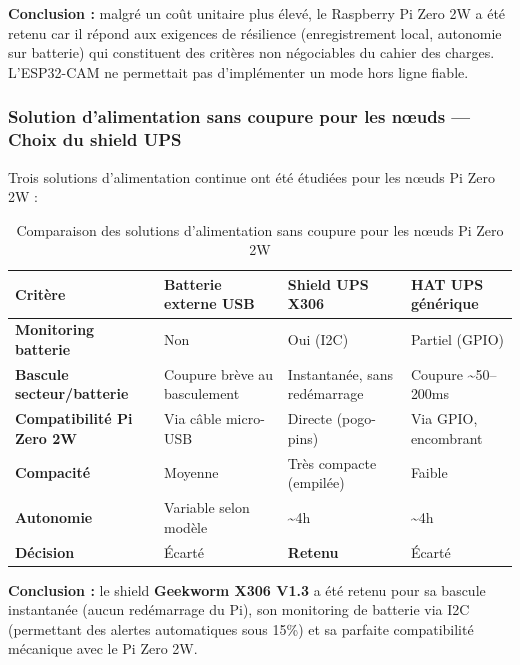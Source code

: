 \documentclass[12pt,a4paper]{article}
\begin{document}
\textbf{Conclusion :} malgré un coût unitaire plus élevé, le Raspberry Pi Zero 2W a été retenu car il répond aux exigences de résilience (enregistrement local, autonomie sur batterie) qui constituent des critères non négociables du cahier des charges. L'ESP32-CAM ne permettait pas d'implémenter un mode hors ligne fiable.

\subsubsection{Solution d'alimentation sans coupure pour les nœuds --- Choix du shield UPS}

Trois solutions d'alimentation continue ont été étudiées pour les nœuds Pi Zero 2W :

\begin{table}[H]
\centering
\small
\renewcommand{\arraystretch}{1.3}
\begin{tabular}{|l|p{3.2cm}|p{3.2cm}|p{3.2cm}|}
\hline
\textbf{Critère} & \textbf{Batterie externe USB} & \textbf{Shield UPS X306} & \textbf{HAT UPS générique} \\
\hline
\textbf{Monitoring batterie} & Non & Oui (I2C) & Partiel (GPIO) \\
\hline
\textbf{Bascule secteur/batterie} & Coupure brève au basculement & Instantanée, sans redémarrage & Coupure \textasciitilde 50--200ms \\
\hline
\textbf{Compatibilité Pi Zero 2W} & Via câble micro-USB & Directe (pogo-pins) & Via GPIO, encombrant \\
\hline
\textbf{Compacité} & Moyenne & Très compacte (empilée) & Faible \\
\hline
\textbf{Autonomie} & Variable selon modèle & \textasciitilde 4h & \textasciitilde 4h \\
\hline
\textbf{Décision} & Écarté & \textcolor{green!60!black}{\textbf{Retenu}} & Écarté \\
\hline
\end{tabular}
\caption{Comparaison des solutions d'alimentation sans coupure pour les nœuds Pi Zero 2W}
\end{table}

\textbf{Conclusion :} le shield \textbf{Geekworm X306 V1.3} a été retenu pour sa bascule instantanée (aucun redémarrage du Pi), son monitoring de batterie via I2C (permettant des alertes automatiques sous 15\%) et sa parfaite compatibilité mécanique avec le Pi Zero 2W.
\end{document}
